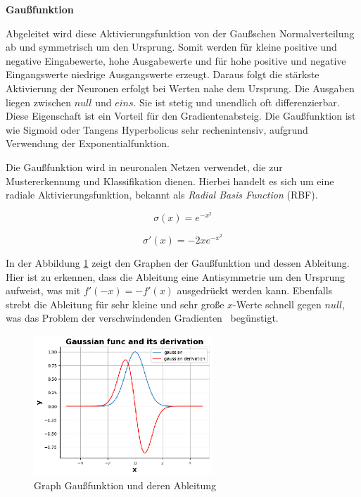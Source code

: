 %
\textbf{Gaußfunktion}\vspace{0.2cm}

Abgeleitet wird diese Aktivierungsfunktion von der Gaußschen Normalverteilung ab und symmetrisch um den Ursprung. Somit werden für kleine positive und negative Eingabewerte, hohe Ausgabewerte und für hohe positive und negative Eingangswerte niedrige Ausgangswerte erzeugt. Daraus folgt die stärkste Aktivierung der Neuronen erfolgt bei Werten nahe dem Ursprung. Die Ausgaben liegen zwischen $null$ und $eins$. Sie ist stetig und unendlich oft differenzierbar. Diese Eigenschaft ist ein Vorteil für den Gradientenabsteig. Die Gaußfunktion ist wie Sigmoid oder Tangens Hyperbolicus sehr rechenintensiv, aufgrund Verwendung der Exponentialfunktion.\vspace{0.2cm}

Die Gaußfunktion wird in neuronalen Netzen verwendet, die zur Mustererkennung und Klassifikation dienen. Hierbei handelt es sich um eine radiale Aktivierungsfunktion, bekannt als \textit{Radial Basis Function} (\acrshort{RBF}).

\begin{equation}\label{eq:gaussian_function}
	\sigma (x) = e^{-x^{2}}
\end{equation}

\begin{equation}\label{eq:derivative_gaussian_function}
	\sigma' (x) = -2x e^{-x^{2}}
\end{equation}

In der Abbildung \ref{img:gaussian_func_graph} zeigt den Graphen der Gaußfunktion und dessen Ableitung. Hier ist zu erkennen, dass die Ableitung eine Antisymmetrie um den Ursprung aufweist, was mit $f'(-x) = -f'(x)$ ausgedrückt werden kann. Ebenfalls strebt die Ableitung für sehr kleine und sehr große $x$-Werte schnell gegen $null$, was das \glqq Problem der verschwindenden Gradienten \grqq \ begünstigt.

\begin{figure}[!ht]
	\includegraphics[width=0.6\textwidth]{content/chapter_basics/plots/gaussian_func_plot.eps}
	\centering
	\caption{Graph Gaußfunktion und deren Ableitung}
	\label{img:gaussian_func_graph}
\end{figure}

